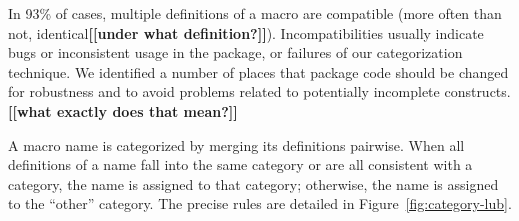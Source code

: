 \documentclass[10pt]{article}
\newcommand{\comment}[1]{\textbf{[[#1]]}}
\begin{document}

In 93\% of cases, multiple definitions of a macro are compatible (more
often than not, identical\comment{under what definition?}).  Incompatibilities usually indicate bugs or
inconsistent usage in the package, or failures of our categorization
technique.  We identified a number of places that package code should be
changed for robustness and to avoid problems related to potentially
incomplete constructs.\comment{what exactly does that mean?}

A macro name is categorized by merging its definitions pairwise.  When all
definitions of a name fall into the same category or are all consistent
with a category, the name is assigned to that category; otherwise, the name
is assigned to the ``other'' category.  The precise rules
are detailed in Figure~\ref{fig:category-lub}.
\end{document}
